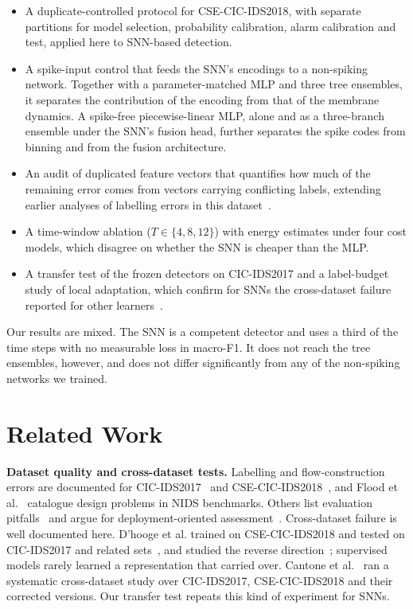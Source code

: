 \documentclass[conference]{IEEEtran}
\begin{document}
\begin{itemize}
\item A duplicate-controlled protocol for CSE-CIC-IDS2018, with separate partitions for model selection, probability calibration, alarm calibration and test, applied here to SNN-based detection.
\item A spike-input control that feeds the SNN's encodings to a non-spiking network. Together with a parameter-matched MLP and three tree ensembles, it separates the contribution of the encoding from that of the membrane dynamics. A spike-free piecewise-linear MLP, alone and as a three-branch ensemble under the SNN's fusion head, further separates the spike codes from binning and from the fusion architecture.
\item An audit of duplicated feature vectors that quantifies how much of the remaining error comes from vectors carrying conflicting labels, extending earlier analyses of labelling errors in this dataset~\cite{liu2022}.
\item A time-window ablation ($T \in \{4,8,12\}$) with energy estimates under four cost models, which disagree on whether the SNN is cheaper than the MLP.
\item A transfer test of the frozen detectors on CIC-IDS2017 and a label-budget study of local adaptation, which confirm for SNNs the cross-dataset failure reported for other learners~\cite{dhooge2023sensors,cantone2024}.
\end{itemize}

Our results are mixed. The SNN is a competent detector and uses a third of the time steps with no measurable loss in macro-F1. It does not reach the tree ensembles, however, and does not differ significantly from any of the non-spiking networks we trained.

\section{Related Work}

\textbf{Dataset quality and cross-dataset tests.} Labelling and flow-construction errors are documented for CIC-IDS2017~\cite{engelen2021,lanvin2023} and CSE-CIC-IDS2018~\cite{liu2022}, and Flood et al.~\cite{flood2024} catalogue design problems in NIDS benchmarks. Others list evaluation pitfalls~\cite{arp2022,sommer2010} and argue for deployment-oriented assessment~\cite{apruzzese2023sok}. Cross-dataset failure is well documented here. D'hooge et al. trained on CSE-CIC-IDS2018 and tested on CIC-IDS2017 and related sets~\cite{dhooge2023sensors}, and studied the reverse direction~\cite{dhooge2023jcp}; supervised models rarely learned a representation that carried over. Cantone et al.~\cite{cantone2024} ran a systematic cross-dataset study over CIC-IDS2017, CSE-CIC-IDS2018 and their corrected versions. Our transfer test repeats this kind of experiment for SNNs.
\end{document}
